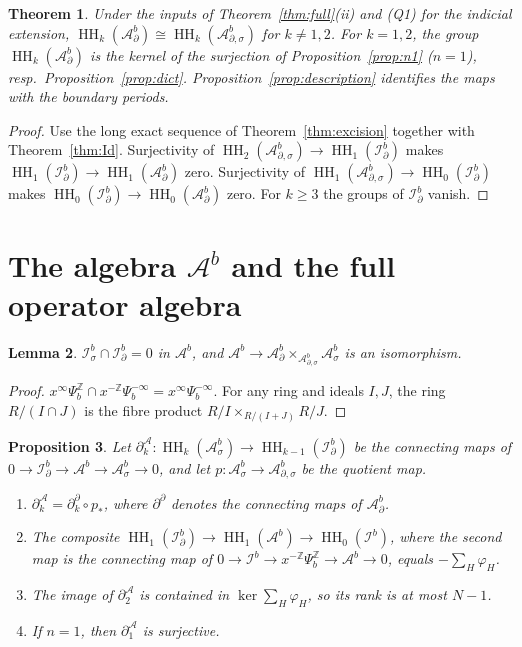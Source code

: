\documentclass[11pt,oneside,reqno]{article}
\DeclareMathOperator{\HH}{HH}
\newcommand{\Z}{\mathbb Z}
\newcommand{\Ib}{\mathcal I^b}
\newcommand{\Idb}{\mathcal I^b_\partial}
\newcommand{\Isb}{\mathcal I^b_\sigma}
\newcommand{\Ab}{\mathcal A^b}
\newcommand{\Asb}{\mathcal A^b_\sigma}
\newcommand{\Adb}{\mathcal A^b_\partial}
\newcommand{\Adsb}{\mathcal A^b_{\partial,\sigma}}
\theoremstyle{plain}
\newtheorem{theorem}{Theorem}[section]
\newtheorem{proposition}[theorem]{Proposition}
\newtheorem{lemma}[theorem]{Lemma}
\theoremstyle{definition}
\theoremstyle{remark}
\begin{document}
\begin{theorem}\label{thm:Ad}
Under the inputs of Theorem~\ref{thm:full}(ii) and (Q1) for the
indicial extension,
\(\HH_k(\Adb)\cong\HH_k(\Adsb)\) for \(k\neq1,2\). For \(k=1,2\), the group
\(\HH_k(\Adb)\) is the kernel of the surjection of
Proposition~\ref{prop:n1} (\(n=1\)), resp.\ Proposition~\ref{prop:dict}.
Proposition~\ref{prop:description} identifies the maps with the boundary periods.
\end{theorem}

\begin{proof}
Use the long exact sequence of Theorem~\ref{thm:excision} together with
Theorem~\ref{thm:Id}. Surjectivity of
\(\HH_2(\Adsb)\to\HH_1(\Idb)\) makes \(\HH_1(\Idb)\to\HH_1(\Adb)\) zero.
Surjectivity of \(\HH_1(\Adsb)\to\HH_0(\Idb)\) makes
\(\HH_0(\Idb)\to\HH_0(\Adb)\) zero. For \(k\geq3\) the groups of \(\Idb\)
vanish.
\end{proof}

\section{\texorpdfstring{The algebra \(\Ab\) and the full operator algebra}{The algebra Ab and the full operator algebra}}\label{sec:A}

\begin{lemma}\label{lem:fibre}
\(\Isb\cap\Idb=0\) in \(\Ab\), and \(\Ab\to\Adb\times_{\Adsb}\Asb\) is an
isomorphism.
\end{lemma}

\begin{proof}
\(x^\infty\Psi_b^{\Z}\cap x^{-\Z}\Psi_b^{-\infty}=x^\infty\Psi_b^{-\infty}\).
For any ring and ideals \(I,J\), the ring \(R/(I\cap J)\) is the fibre product
\(R/I\times_{R/(I+J)}R/J\).
\end{proof}

\begin{proposition}\label{prop:connA}
Let \(\partial^{\mathcal A}_k:\HH_k(\Asb)\to\HH_{k-1}(\Idb)\) be the connecting
maps of \(0\to\Idb\to\Ab\to\Asb\to0\), and let \(p:\Asb\to\Adsb\) be the
quotient map.
\begin{enumerate}
\item[(a)] \(\partial^{\mathcal A}_k=\partial^{\partial}_k\circ p_*\), where
\(\partial^\partial\) denotes the connecting maps of \(\Adb\).
\item[(b)] The composite \(\HH_1(\Idb)\to\HH_1(\Ab)\to\HH_0(\Ib)\), where
the second map is the connecting map of
\(0\to\Ib\to x^{-\Z}\Psi_b^{\Z}\to\Ab\to0\), equals
\(-\sum_H\varphi_H\).
\item[(c)] The image of \(\partial^{\mathcal A}_2\) is contained in
\(\ker\sum_H\varphi_H\), so its rank is at most \(N-1\).
\item[(d)] If \(n=1\), then \(\partial^{\mathcal A}_1\) is surjective.
\end{enumerate}
\end{proposition}
\end{document}
